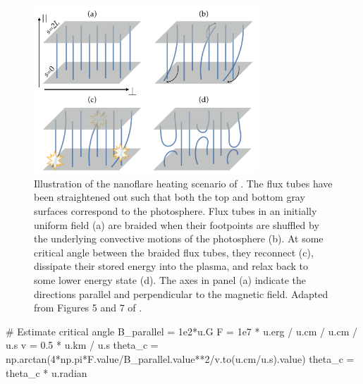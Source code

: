 \begin{figure}
    \centering
    \includegraphics[width=0.75\textwidth]{chapter1/figures/nanoflare-cartoon.pdf}
    \caption{Illustration of the nanoflare heating scenario of \citet{parker_nanoflares_1988}. The flux tubes have been straightened out such that both the top and bottom gray surfaces correspond to the photosphere. Flux tubes in an initially uniform field (a) are braided when their footpoints are shuffled by the underlying convective motions of the photosphere (b). At some critical angle between the braided flux tubes, they reconnect (c), dissipate their stored energy into the plasma, and relax back to some lower energy state (d). The axes in panel (a) indicate the directions parallel and perpendicular to the magnetic field. Adapted from Figures 5 and 7 of \citet{klimchuk_key_2015}.}
    \label{fig:nanoflare-cartoon}
\end{figure}

\begin{pycode}[chapter2]
# Estimate critical angle
B_parallel = 1e2*u.G
F = 1e7 * u.erg / u.cm / u.cm / u.s
v = 0.5 * u.km / u.s
theta_c = np.arctan(4*np.pi*F.value/B_parallel.value**2/v.to(u.cm/u.s).value)
theta_c = theta_c * u.radian
\end{pycode}

